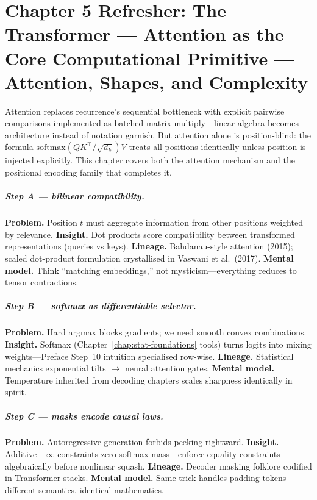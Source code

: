 \chapter{Chapter 5 Refresher: The Transformer --- Attention as the Core Computational Primitive --- Attention, Shapes, and Complexity}
\label{chap:transformer}

\scenelabel
Attention replaces recurrence's sequential bottleneck with explicit pairwise comparisons implemented as batched matrix multiply---linear algebra becomes architecture instead of notation garnish. But attention alone is position-blind: the formula $\mathrm{softmax}(QK^\top/\sqrt{d_k})V$ treats all positions identically unless position is injected explicitly. This chapter covers both the attention mechanism and the positional encoding family that completes it.

\paragraph{Step A --- bilinear compatibility.}
\textbf{Problem.} Position \(t\) must aggregate information from other positions weighted by relevance.
\textbf{Insight.} Dot products score compatibility between transformed representations (queries vs keys).
\textbf{Lineage.} Bahdanau-style attention (2015); scaled dot-product formulation crystallised in Vaswani et al.\ (2017).
\textbf{Mental model.} Think ``matching embeddings,'' not mysticism---everything reduces to tensor contractions.

\paragraph{Step B --- softmax as differentiable selector.}
\textbf{Problem.} Hard argmax blocks gradients; we need smooth convex combinations.
\textbf{Insight.} Softmax (Chapter~\ref{chap:stat-foundations} tools) turns logits into mixing weights---Preface Step~10 intuition specialised row-wise.
\textbf{Lineage.} Statistical mechanics exponential tilts $\to$ neural attention gates.
\textbf{Mental model.} Temperature inherited from decoding chapters scales sharpness identically in spirit.

\paragraph{Step C --- masks encode causal laws.}
\textbf{Problem.} Autoregressive generation forbids peeking rightward.
\textbf{Insight.} Additive \(-\infty\) constraints zero softmax mass---enforce equality constraints algebraically before nonlinear squash.
\textbf{Lineage.} Decoder masking folklore codified in Transformer stacks.
\textbf{Mental model.} Same trick handles padding tokens---different semantics, identical mathematics.

